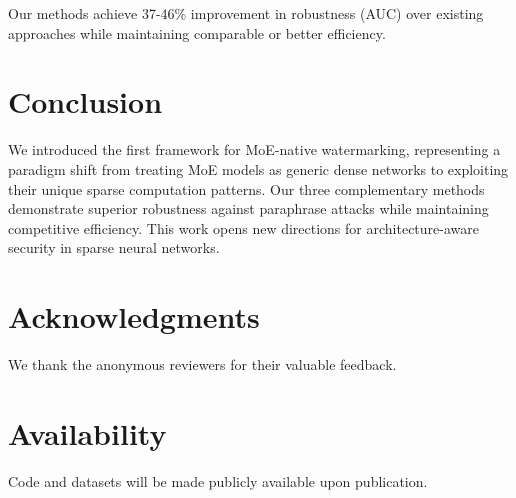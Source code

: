 \documentclass[letterpaper,twocolumn,10pt]{article}
\begin{document}
Our methods achieve 37-46\% improvement in robustness (AUC) over existing approaches while maintaining comparable or better efficiency.

\section{Conclusion}

We introduced the first framework for MoE-native watermarking, representing a paradigm shift from treating MoE models as generic dense networks to exploiting their unique sparse computation patterns. Our three complementary methods demonstrate superior robustness against paraphrase attacks while maintaining competitive efficiency. This work opens new directions for architecture-aware security in sparse neural networks.

\section*{Acknowledgments}

We thank the anonymous reviewers for their valuable feedback.

\section*{Availability}

Code and datasets will be made publicly available upon publication.



\end{document}
